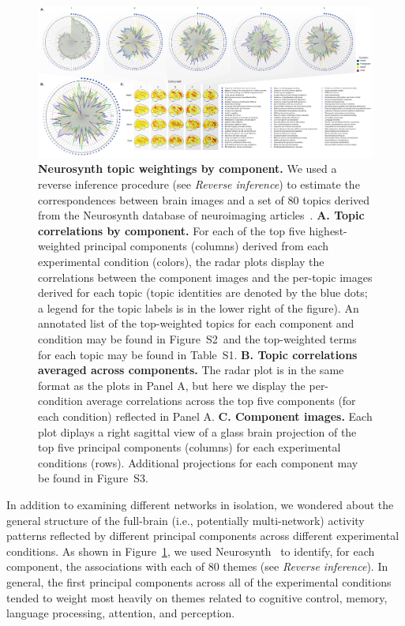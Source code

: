 \documentclass[english, 11pt]{article}
\newcommand{\topTerms}{S2}
\newcommand{\componentBrains}{S3}
\newcommand{\topics}{S1}
\begin{document}
\begin{figure}[tp]
  \centering
  \includegraphics[width=\textwidth]{figs/neurosynth_by_component}

\caption{\textbf{Neurosynth topic weightings by component.} We used a reverse
inference procedure (see \textit{Reverse inference}) to estimate the
correspondences between brain images and a set of 80 topics derived from the
Neurosynth database of neuroimaging articles~\citep{RubiEtal17}. \textbf{A.
Topic correlations by component.} For each of the top five highest-weighted
principal components (columns) derived from each experimental condition
(colors), the radar plots display the correlations between the component images
and the per-topic images derived for each topic (topic identities are denoted
by the blue dots; a legend for the topic labels is in the lower right of the
figure). An annotated list of the top-weighted topics for each component and
condition may be found in Figure~\topTerms~and the top-weighted terms for each
topic may be found in Table~\topics. \textbf{B. Topic correlations averaged
across components.} The radar plot is in the same format as the plots in Panel
A, but here we display the per-condition average correlations across the top
five components (for each condition) reflected in Panel A. \textbf{C. Component
images.} Each plot diplays a right sagittal view of a glass brain projection of
the top five principal components (columns) for each experimental conditions
(rows). Additional projections for each component may be found in
Figure~\componentBrains.}

\label{fig:neurosynth-pca}

\end{figure}

In addition to examining different networks in isolation, we wondered about the
general structure of the full-brain (i.e., potentially multi-network) activity
patterns reflected by different principal components across different
experimental conditions. As shown in Figure~\ref{fig:neurosynth-pca}, we used
Neurosynth~\citep{RubiEtal17} to identify, for each component, the associations
with each of 80 themes (see \textit{Reverse inference}).  In general, the first
principal components across all of the experimental conditions tended to weight
most heavily on themes related to cognitive control, memory,
language processing, attention, and perception.  
\end{document}

